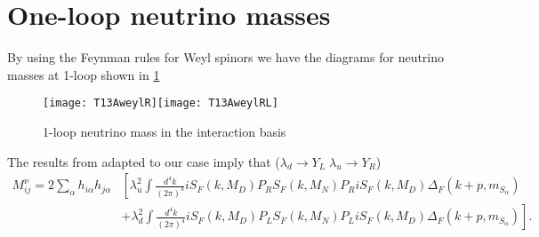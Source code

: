 \section{One-loop neutrino masses}
\label{sec:mass-interaction-basis}

By using the Feynman rules for Weyl spinors we have the diagrams for
neutrino masses at 1-loop shown in \ref{fig:t13aweyl}
\begin{figure}
  \centering
\texttt{[image: T13AweylR]}\qquad \texttt{[image: T13AweylRL]}
  \caption{1-loop neutrino mass in the interaction basis}
  \label{fig:t13aweyl}
\end{figure}

The results from \cite{Bonnet:2012kz,Suematsu:2010nd} adapted to our case imply that ($\lambda_d \to Y_L\; \lambda_u \to Y_R$)
\begin{align}
  M^{\nu}_{ij}=2\sum_{\alpha}h_{i\alpha}h_{j\alpha} &\left[  \lambda_u^2\int \frac{d^4 k}{(2\pi)^4}i S_F \left(k,M_D \right)P_R S_F \left(k,M_N \right)P_R i S_F \left(k,M_D \right)
             \Delta_F \left( k+p,m_{S_\alpha} \right)\right. \nonumber\\
          &\left.+\lambda_d^2\int \frac{d^4 k}{(2\pi)^4}i S_F \left(k,M_D \right)P_L S_F \left(k,M_N \right)P_L i S_F \left(k,M_D \right)
             \Delta_F \left( k+p,m_{S_\alpha} \right) 
            \right].
\end{align}

